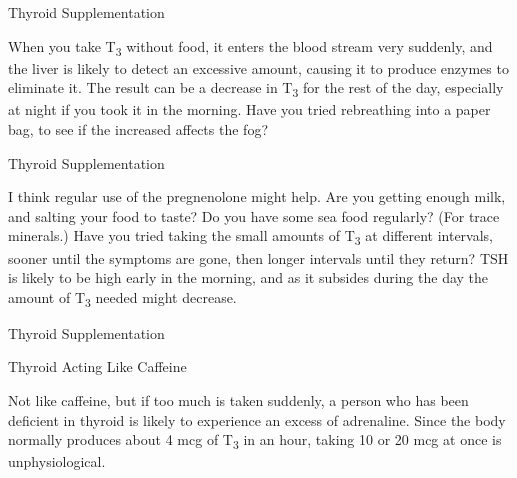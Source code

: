 \documentclass[11pt,oneside,openany,extrafontsizes]{memoir}
\begin{document}
\begin{standalonequote}{Thyroid Supplementation}

    \begin{answer}
        When you take T\textsubscript{3} without food, it enters the blood stream very suddenly, and the liver is likely to detect an excessive amount, causing it to produce enzymes to eliminate it. The result can be a decrease in T\textsubscript{3} for the rest of the day, especially at night if you took it in the morning. Have you tried rebreathing into a paper bag, to see if the increased  affects the fog?
    \end{answer}
\end{standalonequote}

\begin{standalonequote}{Thyroid Supplementation}

    \begin{answer}
        I think regular use of the pregnenolone might help. Are you getting enough milk, and salting your food to taste? Do you have some sea food regularly? (For trace minerals.) Have you tried taking the small amounts of T\textsubscript{3} at different intervals, sooner until the symptoms are gone, then longer intervals until they return? TSH is likely to be high early in the morning, and as it subsides during the day the amount of T\textsubscript{3} needed might decrease.
    \end{answer}
\end{standalonequote}

\begin{standalonequote}{Thyroid Supplementation}
    \begin{note}
       Thyroid Acting Like Caffeine
    \end{note}

    \begin{answer}
        Not like caffeine, but if too much is taken suddenly, a person who has been deficient in thyroid is likely to experience an excess of adrenaline. Since the body normally produces about 4 mcg of T\textsubscript{3} in an hour, taking 10 or 20 mcg at once is unphysiological.
    \end{answer}
\end{standalonequote}
\end{document}
